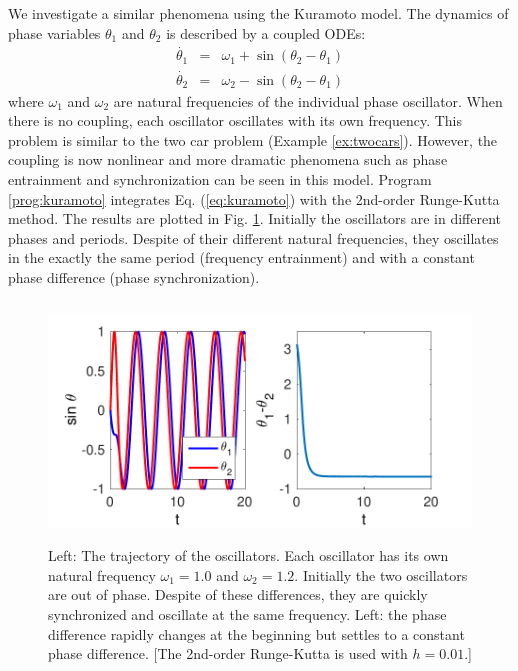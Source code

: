 We investigate a similar phenomena using the Kuramoto model.
The dynamics of phase variables $\theta_1$ and $\theta_2$ is described by a coupled ODEs\cite{coupled_oscillators}:
\begin{subequations}
\begin{eqnarray}
\dot{\theta_1}&=& \omega_1 + \sin(\theta_2-\theta_1)\\
\dot{\theta_2}&=& \omega_2 - \sin(\theta_2-\theta_1)
\end{eqnarray}
\label{eq:kuramoto}
\end{subequations}
\noindent
where $\omega_1$ and $\omega_2$ are natural frequencies of the individual phase oscillator.  When there is no coupling, each oscillator oscillates with its own frequency.
This problem is similar to the two car problem (Example \ref{ex:twocars}).  However, the coupling is now nonlinear and more dramatic phenomena such as phase entrainment and synchronization can be seen in this model.
Program \ref{prog:kuramoto} integrates Eq. (\ref{eq:kuramoto}) with the 2nd-order Runge-Kutta method.  The results are plotted in Fig.
\ref{fig:kuramoto}.   Initially the oscillators are in different phases and periods.  Despite of their different natural frequencies, they oscillates in the exactly the same period (frequency entrainment) and with a constant phase difference (phase synchronization).

\begin{figure}
\centerline{\includegraphics[height=2.5in]{05.ode1/kuramoto.pdf}}
\caption{Left: The trajectory of the oscillators.  Each oscillator has its own natural frequency $\omega_1=1.0$ and $\omega_2=1.2$. Initially the two oscillators are out of phase.  Despite of these differences, they are quickly synchronized  and oscillate at the same frequency. Left: the phase difference rapidly changes at the beginning but settles to a constant phase difference.  [The 2nd-order Runge-Kutta is used with $h=0.01$.]}
\label{fig:kuramoto}
\end{figure}

